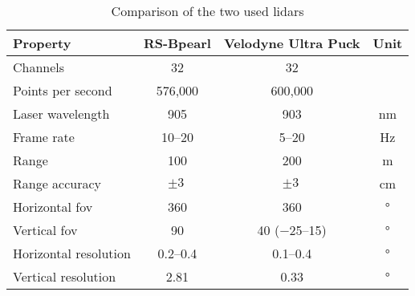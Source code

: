 \begin{table}[ht]
	\centering
	\caption{Comparison of the two used \acrshort{lidar}s \cite{RoboSense2020, Velodyne2018}}
	\label{tab:lidar_datasheets}
	\begin{tabular}[t]{lccc}
		\toprule
		\textbf{Property}     & \textbf{RS-Bpearl}   & \textbf{Velodyne Ultra Puck}    & \textbf{Unit}     \\
		\midrule
		Channels              & 32                   & 32                              &                   \\
		Points per second     & 576,000              & 600,000                         & \si{}             \\
		Laser wavelength      & \SI{905}{}           & \SI{903}{}                      & \si{\nano\metre}  \\
		Frame rate            & \SIrange{10}{20}{}   & \SIrange{5}{20}{}               & \si{\hertz}       \\
		Range                 & \SI{100}{}           & \SI{200}{}                      & \si{\metre}       \\
		Range accuracy        & $\pm\SI{3}{}$        & $\pm\SI{3}{}$                   & \si{\centi\metre} \\
		Horizontal \gls{fov}  & \SI{360}{}           & \SI{360}{}                      & \si{\degree}      \\
		Vertical \gls{fov}    & \SI{90}{}            & \SI{40}{} (\SIrange{-25}{15}{}) & \si{\degree}      \\
		Horizontal resolution & \SIrange{0.2}{0.4}{} & \SIrange{0.1}{0.4}{}            & \si{\degree}      \\
		Vertical resolution   & \SI{2.81}{}          & \SI{0.33}{}                     & \si{\degree}      \\
		\bottomrule
	\end{tabular}
\end{table}


